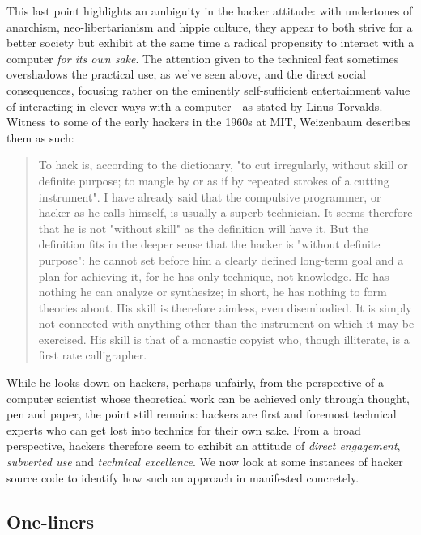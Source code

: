 \documentclass{article}
\begin{document}
This last point highlights an ambiguity in the hacker attitude: with undertones of anarchism, neo-libertarianism and hippie culture, they appear to both strive for a better society but exhibit at the same time a radical propensity to interact with a computer \emph{for its own sake}. The attention given to the technical feat sometimes overshadows the practical use, as we've seen above, and the direct social consequences, focusing rather on the eminently self-sufficient entertainment value of interacting in clever ways with a computer—as stated by Linus Torvalds\cite{pekka_himanen_hacker_2001}. Witness to some of the early hackers in the 1960s at MIT, Weizenbaum describes them as such:

\begin{quote}
  To hack is, according to the dictionary, "to cut irregularly, without skill or definite purpose; to mangle by or as if by repeated strokes of a cutting instrument". I have already said that the compulsive programmer, or hacker as he calls himself, is usually a superb technician. It seems therefore that he is not "without skill" as the definition will have it. But the definition fits in the deeper sense that the hacker is "without definite purpose": he cannot set before him a clearly defined long-term goal and a plan for achieving it, for he has only technique, not knowledge. He has nothing he can analyze or synthesize; in short, he has nothing to form theories about. His skill is therefore aimless, even disembodied. It is simply not connected with anything other than the instrument on which it may be exercised. His skill is that of a monastic copyist who, though illiterate, is a first rate calligrapher.\cite{weizenbaum_computer_1976}
\end{quote}

While he looks down on hackers, perhaps unfairly, from the perspective of a computer scientist whose theoretical work can be achieved only through thought, pen and paper, the point still remains: hackers are first and foremost technical experts who can get lost into technics for their own sake. From a broad perspective, hackers therefore seem to exhibit an attitude of \emph{direct engagement}, \emph{subverted use} and \emph{technical excellence}. We now look at some instances of hacker source code to identify how such an approach in manifested concretely.

\vspace{1\baselineskip}

\subsection{One-liners}
\end{document}
